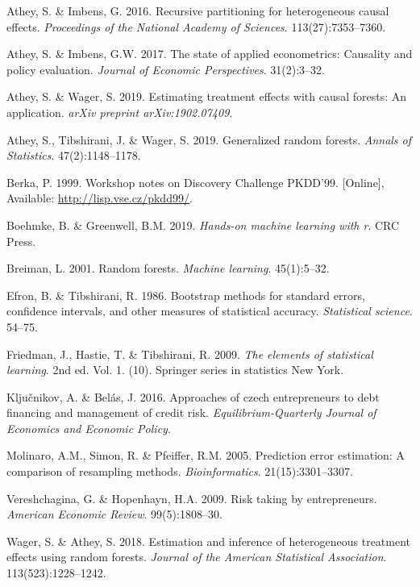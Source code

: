 \documentclass[11pt,preprint, authoryear]{elsarticle}
\numberwithin{equation}{section}
\numberwithin{figure}{section}
\numberwithin{table}{section}
\newlength{\cslhangindent}
\newenvironment{CSLReferences}%
  {\setlength{\parindent}{0pt}%
  \everypar{\setlength{\hangindent}{\cslhangindent}}\ignorespaces}%
  {\par}
\begin{document}
\hypertarget{refs}{}
\begin{CSLReferences}{1}{0}
\leavevmode\hypertarget{ref-AtheyImbensRecursive}{}%
Athey, S. \& Imbens, G. 2016. Recursive partitioning for heterogeneous
causal effects. \emph{Proceedings of the National Academy of Sciences}.
113(27):7353--7360.

\leavevmode\hypertarget{ref-StateOfEconometrics}{}%
Athey, S. \& Imbens, G.W. 2017. The state of applied econometrics:
Causality and policy evaluation. \emph{Journal of Economic
Perspectives}. 31(2):3--32.

\leavevmode\hypertarget{ref-Athey2019Application}{}%
Athey, S. \& Wager, S. 2019. Estimating treatment effects with causal
forests: An application. \emph{arXiv preprint arXiv:1902.07409}.

\leavevmode\hypertarget{ref-AtheyGRF2019}{}%
Athey, S., Tibshirani, J. \& Wager, S. 2019. Generalized random forests.
\emph{Annals of Statistics}. 47(2):1148--1178.

\leavevmode\hypertarget{ref-Data}{}%
Berka, P. 1999. {Workshop notes on Discovery Challenge PKDD'99}.
{[}Online{]}, Available: \url{http://lisp.vse.cz/pkdd99/}.

\leavevmode\hypertarget{ref-Boehmke}{}%
Boehmke, B. \& Greenwell, B.M. 2019. \emph{Hands-on machine learning
with r}. CRC Press.

\leavevmode\hypertarget{ref-Breiman2001}{}%
Breiman, L. 2001. Random forests. \emph{Machine learning}. 45(1):5--32.

\leavevmode\hypertarget{ref-Efron}{}%
Efron, B. \& Tibshirani, R. 1986. Bootstrap methods for standard errors,
confidence intervals, and other measures of statistical accuracy.
\emph{Statistical science}. 54--75.

\leavevmode\hypertarget{ref-ESL}{}%
Friedman, J., Hastie, T. \& Tibshirani, R. 2009. \emph{The elements of
statistical learning}. 2nd ed. Vol. 1. (10). Springer series in
statistics New York.

\leavevmode\hypertarget{ref-Entrep}{}%
Ključnikov, A. \& Belás, J. 2016. Approaches of czech entrepreneurs to
debt financing and management of credit risk.
\emph{Equilibrium-Quarterly Journal of Economics and Economic Policy}.

\leavevmode\hypertarget{ref-Molinaro}{}%
Molinaro, A.M., Simon, R. \& Pfeiffer, R.M. 2005. Prediction error
estimation: A comparison of resampling methods. \emph{Bioinformatics}.
21(15):3301--3307.

\leavevmode\hypertarget{ref-Risk}{}%
Vereshchagina, G. \& Hopenhayn, H.A. 2009. Risk taking by entrepreneurs.
\emph{American Economic Review}. 99(5):1808--30.

\leavevmode\hypertarget{ref-AtheyASA2018}{}%
Wager, S. \& Athey, S. 2018. Estimation and inference of heterogeneous
treatment effects using random forests. \emph{Journal of the American
Statistical Association}. 113(523):1228--1242.

\end{CSLReferences}
\end{document}
